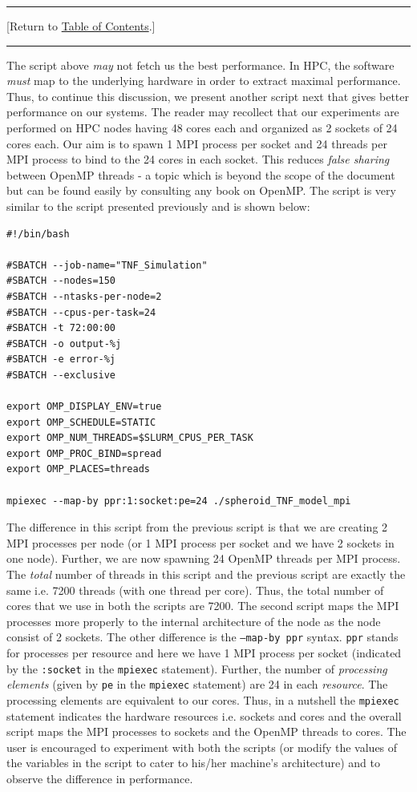 \documentclass[12pt]{article}
\newcommand{\TOClink}{\begin{center}\hrule\vskip-5pt\phantom{.}\hfill[Return to \hyperlink{TOC}{Table of Contents}.]\hfill\phantom{.}\vskip3pt\hrule\end{center}}
\begin{document}
\TOClink

The script above \textit{may} not fetch us the best performance. In HPC, the software \textit{must} map to the underlying hardware in order to extract maximal performance. Thus, to continue this discussion, we present another script next that gives better performance on our systems. The reader may recollect that our experiments are performed on HPC nodes having 48 cores each and organized as 2 sockets of 24 cores each. Our aim is to spawn 1 MPI process per socket and 24 threads per MPI process to bind to the 24 cores in each socket. This reduces \textit{false sharing} between OpenMP threads - a topic which is beyond the scope of the document but can be found easily by consulting any book on OpenMP. The script is very similar to the script presented previously and is shown below:

\begin{verbatim}
#!/bin/bash

#SBATCH --job-name="TNF_Simulation"
#SBATCH --nodes=150
#SBATCH --ntasks-per-node=2
#SBATCH --cpus-per-task=24
#SBATCH -t 72:00:00
#SBATCH -o output-%j
#SBATCH -e error-%j
#SBATCH --exclusive

export OMP_DISPLAY_ENV=true
export OMP_SCHEDULE=STATIC
export OMP_NUM_THREADS=$SLURM_CPUS_PER_TASK
export OMP_PROC_BIND=spread
export OMP_PLACES=threads 

mpiexec --map-by ppr:1:socket:pe=24 ./spheroid_TNF_model_mpi  

\end{verbatim}

The difference in this script from the previous script is that we are creating 2 MPI processes per node (or 1 MPI process per socket and we have 2 sockets in one node). Further, we are now spawning 24 OpenMP threads per MPI process. The \textit{total} number of threads in this script and the previous script are exactly the same i.e. 7200 threads (with one thread per core). Thus, the total number of cores that we use in both the scripts are 7200. The second script maps the MPI processes more properly to the internal architecture of the node as the node consist of 2 sockets. The other difference is the \texttt{--map-by ppr} syntax. \texttt{ppr} stands for processes per resource and here we have 1 MPI process per socket (indicated by the \texttt{:socket} in the \texttt{mpiexec} statement). Further, the number of \textit{processing elements} (given by \texttt{pe} in the \texttt{mpiexec} statement) are 24 in each \textit{resource}. The processing elements are equivalent to our cores. Thus, in a nutshell the \texttt{mpiexec} statement indicates the hardware resources i.e. sockets and cores and the overall script maps the MPI processes to sockets and the OpenMP threads to cores. The user is encouraged to experiment with both the scripts (or modify the values of the variables in the script to cater to his/her machine's architecture) and to observe the difference in performance.
\end{document}

